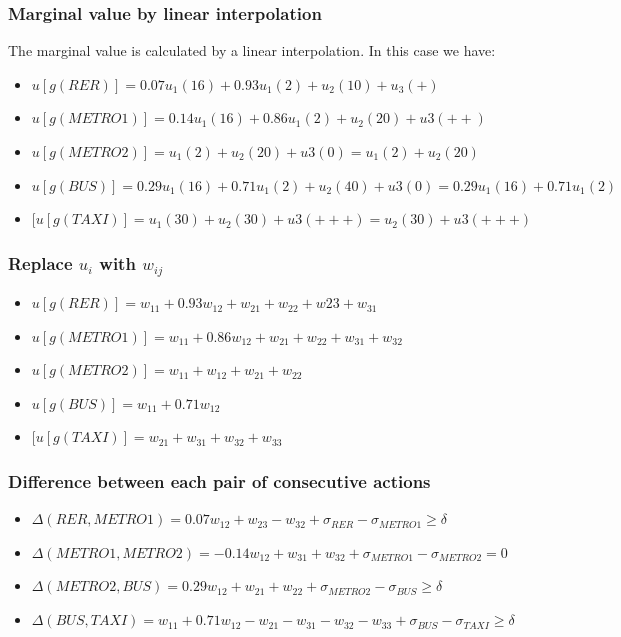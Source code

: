 \documentclass{report}
\begin{document}
\subsubsection{Marginal value by linear interpolation}
The marginal value is calculated by a linear interpolation. In this case we have: 
\begin{itemize}
\item $u[g(RER)]= 0.07  u_1 (16) + 0.93 u_1(2)  + u_2(10) + u_3(+)$
\item $u[g(METRO1)]= 0.14  u_1 (16) + 0.86 u_1(2) + u_2(20) + u3(++)$
\item $u[g(METRO2)]= u_1 (2) + u_2(20) + u3(0) =  u_1 (2) + u_2(20) $
\item $u[g(BUS)]= 0.29  u_1 (16) + 0.71 u_1(2) + u_2(40) + u3(0) = 0.29  u_1 (16) + 0.71 u_1(2)$
\item $[u[g(TAXI)]= u_1 (30) + u_2(30) + u3(+++) = u_2(30) + u3(+++)$
\end{itemize}

\subsubsection{Replace $u_i$ with $w_{ij} $}
\begin{itemize}
\item $u[g(RER)]= w_{11} + 0.93 w_{12} + w_{21} + w_{22} + w{23} + w_{31}$
\item $u[g(METRO1)]=w_{11} + 0.86 w_{12} + w_{21} + w_{22} + w_{31} + w_{32}$
\item $u[g(METRO2)]= w_{11} + w_{12} + w_{21} + w_{22} $
\item $u[g(BUS)]= w_{11} + 0.71 w_{12}$
\item $[u[g(TAXI)]= w_{21} + w_{31} + w_{32} + w_{33}$
\end{itemize}

\subsubsection{Difference between each pair of consecutive actions}
\begin{itemize}
\item $\Delta (RER, METRO1) = 0.07 w_{12} + w_{23} - w_{32} + \sigma_{RER} - \sigma_{METRO1} \geq \delta$
\item $\Delta (METRO1, METRO2) = -0.14 w_{12} + w_{31} + w_{32} + \sigma_{METRO1}- \sigma_{METRO2} = 0$
\item $\Delta (METRO2, BUS) = 0.29 w_{12} + w_{21} + w_{22} + \sigma_{METRO2} - \sigma_{BUS} \geq \delta$
\item $\Delta (BUS, TAXI) = w_{11} + 0.71w_{12} - w_{21} - w_{31} - w_{32} - w_{33} + \sigma_{BUS} - \sigma_{TAXI} \geq \delta$
\end{itemize}
\end{document}
